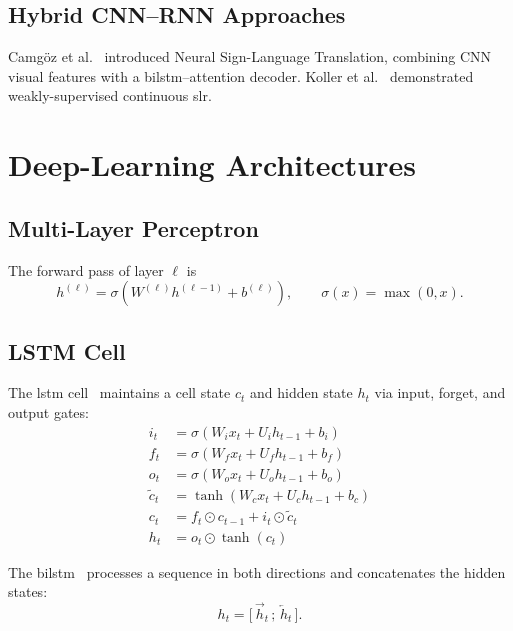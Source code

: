 \subsection{Hybrid CNN--RNN Approaches}
\label{sec:lit:hybrid}

Cam{g\"{o}}z et al.~\cite{camgoz2018neural} introduced Neural Sign-Language
Translation, combining CNN visual features with a \gls{bilstm}--attention
decoder. Koller et al.~\cite{koller2020weakly} demonstrated
weakly-supervised continuous \gls{slr}.

\section{Deep-Learning Architectures}
\label{sec:lit:dl}

\subsection{Multi-Layer Perceptron}
\label{sec:lit:mlp}

The forward pass of layer $\ell$ is
\begin{equation}
  h^{(\ell)} = \sigma\!\left( W^{(\ell)} h^{(\ell-1)} + b^{(\ell)} \right),
  \qquad \sigma(x) = \max(0,x).
\end{equation}

\subsection{LSTM Cell}
\label{sec:lit:lstm}

The \gls{lstm} cell~\cite{hochreiter1997long} maintains a cell state $c_t$
and hidden state $h_t$ via input, forget, and output gates:
\begin{equation}
\begin{aligned}
  i_t &= \sigma(W_i x_t + U_i h_{t-1} + b_i) \\
  f_t &= \sigma(W_f x_t + U_f h_{t-1} + b_f) \\
  o_t &= \sigma(W_o x_t + U_o h_{t-1} + b_o) \\
  \tilde c_t &= \tanh(W_c x_t + U_c h_{t-1} + b_c) \\
  c_t &= f_t \odot c_{t-1} + i_t \odot \tilde c_t \\
  h_t &= o_t \odot \tanh(c_t)
\end{aligned}
\end{equation}

The \gls{bilstm}~\cite{schuster1997bidirectional} processes a sequence in
both directions and concatenates the hidden states:
\begin{equation}
  h_t = \bigl[\, \overrightarrow{h}_t \,;\, \overleftarrow{h}_t \,\bigr].
\end{equation}


